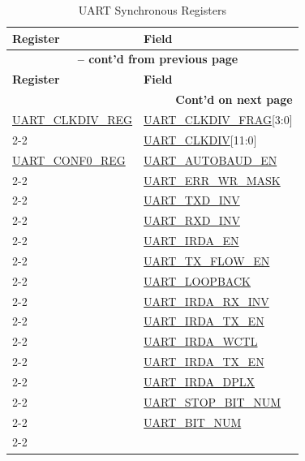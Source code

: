 \documentclass[main\_\_EN.tex]{subfiles}
\begin{document}
\begin{longtable}[c]{|p{6cm}|p{6cm}|}
\caption{UART Synchronous Registers}
\label{tab:uart-sync-reg} \\
    \hline
    \rowcolor{lightgray}
    \textbf{Register} & \textbf{Field} \\\hline
    \endfirsthead

    \multicolumn{2}{c}{\bfseries \tablename\ \thetable{} -- cont'd from previous page}\\\hline
    \rowcolor{lightgray}
    \textbf{Register} & \textbf{Field} \\\hline
    \endhead

    \multicolumn{2}{r}{\textbf{Cont'd on next page}} \\
    \endfoot
    \endlastfoot
\hyperref[regdesc:UARTCLKDIVREG]{UART\_CLKDIV\_REG} & \hyperref[fielddesc:UARTCLKDIVFRAG]{UART\_CLKDIV\_FRAG}[3:0] \\\cline{2-2}
 & \hyperref[fielddesc:UARTCLKDIV]{UART\_CLKDIV}[11:0] \\\hline
\hyperref[regdesc:UARTCONF0REG]{UART\_CONF0\_REG}  & \hyperref[fielddesc:UARTAUTOBAUDEN]{UART\_AUTOBAUD\_EN} \\\cline{2-2}
 & \hyperref[fielddesc:UARTERRWRMASK]{UART\_ERR\_WR\_MASK} \\\cline{2-2}
 & \hyperref[fielddesc:UARTTXDINV]{UART\_TXD\_INV} \\\cline{2-2}
 & \hyperref[fielddesc:UARTRXDINV]{UART\_RXD\_INV} \\\cline{2-2}
 & \hyperref[fielddesc:UARTIRDAEN]{UART\_IRDA\_EN} \\\cline{2-2}
 & \hyperref[fielddesc:UARTTXFLOWEN]{UART\_TX\_FLOW\_EN} \\\cline{2-2}
 & \hyperref[fielddesc:UARTLOOPBACK]{UART\_LOOPBACK} \\\cline{2-2}
 & \hyperref[fielddesc:UARTIRDARXINV]{UART\_IRDA\_RX\_INV} \\\cline{2-2}
 & \hyperref[fielddesc:UARTIRDATXEN]{UART\_IRDA\_TX\_EN} \\\cline{2-2}
 & \hyperref[fielddesc:UARTIRDAWCTL]{UART\_IRDA\_WCTL} \\\cline{2-2}
 & \hyperref[fielddesc:UARTIRDATXEN]{UART\_IRDA\_TX\_EN} \\\cline{2-2}
 & \hyperref[fielddesc:UARTIRDADPLX]{UART\_IRDA\_DPLX} \\\cline{2-2}
 & \hyperref[fielddesc:UARTSTOPBITNUM]{UART\_STOP\_BIT\_NUM} \\\cline{2-2}
 & \hyperref[fielddesc:UARTBITNUM]{UART\_BIT\_NUM} \\\cline{2-2}

\end{longtable}
\end{document}
